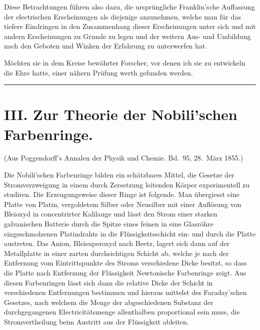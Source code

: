 \documentclass[12pt,a4paper]{article}
\begin{document}
Diese Betrachtungen führen also dazu, die ursprüngliche Franklin'sche Auffassung der electrischen Erscheinungen als diejenige anzunehmen, welche man für das tiefere Eindringen in den Zusammenhang dieser Erscheinungen unter sich und mit andern Erscheinungen zu Grunde zu legen und der weitern Aus- und Umbildung nach den Geboten und Winken der Erfahrung zu unterwerfen hat.

Möchten sie in dem Kreise bewährter Forscher, vor denen ich sie zu entwickeln die Ehre hatte, einer nähern Prüfung werth gefunden werden.

\vspace{2em}
\begin{center}
\rule{0.5\textwidth}{0.4pt}
\end{center}
\vspace{1em}


\section*{III. Zur Theorie der Nobili'schen Farbenringe.}

\begin{center}
\small
(Aus Poggendorff's Annalen der Physik und Chemie. Bd.~95, 28.~März 1855.)
\end{center}
\vspace{0.5em}

Die Nobili'schen Farbenringe bilden ein schätzbares Mittel, die Gesetze der Stromverzweigung in einem durch Zersetzung leitenden Körper experimentell zu studiren. Die Erzeugungsweise dieser Ringe ist folgende. Man übergiesst eine Platte von Platin, vergoldetem Silber oder Neusilber mit einer Auflösung von Bleioxyd in concentrirter Kalilauge und lässt den Strom einer starken galvanischen Batterie durch die Spitze eines feinen in eine Glasröhre eingeschmolzenen Platindrahts in die Flüssigkeitsschicht ein- und durch die Platte austreten. Das Anion, Bleisuperoxyd nach Beetz, lagert sich dann auf der Metallplatte in einer zarten durchsichtigen Schicht ab, welche je nach der Entfernung vom Eintrittspunkte des Stroms verschiedene Dicke besitzt, so dass die Platte nach Entfernung der Flüssigkeit Newtonische Farbenringe zeigt. Aus diesen Farbenringen lässt sich dann die relative Dicke der Schicht in verschiedenen Entfernungen bestimmen und hieraus mittelst des Faraday'schen Gesetzes, nach welchem die Menge der abgeschiedenen Substanz der durchgegangenen Electricitätsmenge allenthalben proportional sein muss, die Stromvertheilung beim Austritt aus der Flüssigkeit ableiten.
\end{document}

